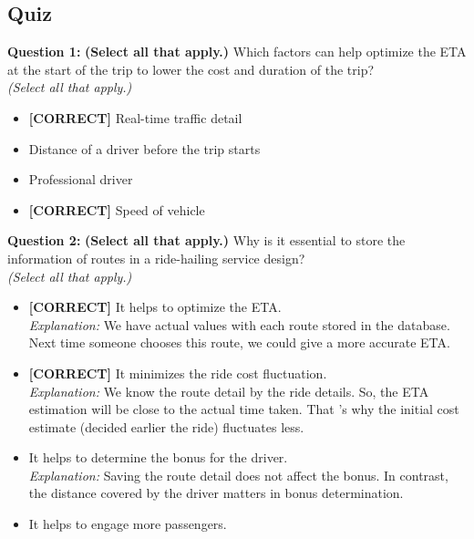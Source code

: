 

\subsection*{Quiz}
\vspace{0.3cm}
\noindent
\textbf{Question 1:} \textbf{(Select all that apply.)} Which factors can help optimize the ETA at the start of the trip to lower the cost and duration of the trip?
\\
\textit{(Select all that apply.)}
\\[0.2cm]
\begin{itemize}
 \item \textbf{[CORRECT]} Real-time traffic detail
 \item Distance of a driver before the trip starts
 \item Professional driver
 \item \textbf{[CORRECT]} Speed of vehicle
\end{itemize}
\vspace{0.3cm}
\noindent
\textbf{Question 2:} \textbf{(Select all that apply.)} Why is it essential to store the information of routes in a ride-hailing service design?
\\
\textit{(Select all that apply.)}
\\[0.2cm]
\begin{itemize}
 \item \textbf{[CORRECT]} It helps to optimize the ETA.
\\[0.1cm]
\textit{Explanation:} 
We have actual values with each route stored in the database. Next time someone chooses this route, we could give a more accurate ETA.
 \item \textbf{[CORRECT]} It minimizes the ride cost fluctuation.
\\[0.1cm]
\textit{Explanation:} 
We know the route detail by the ride details. So, the ETA estimation will be close to the actual time taken. That 's why the initial cost estimate (decided earlier the ride) fluctuates less.
 \item It helps to determine the bonus for the driver.
\\[0.1cm]
\textit{Explanation:} 
Saving the route detail does not affect the bonus. In contrast, the distance covered by the driver matters in bonus determination.
 \item It helps to engage more passengers.
\end{itemize}
